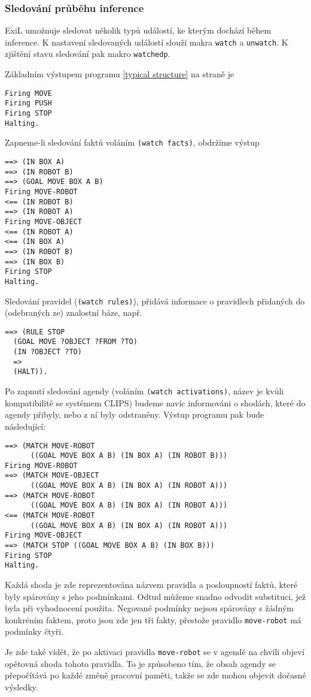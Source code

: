 \subsubsection{Sledování průběhu inference}
\label{inference tracing}
ExiL umožnuje sledovat několik typů událostí, ke kterým dochází během inference.
K nastavení sledovaných událostí slouží makra \verb|watch| a \verb|unwatch|. K
zjištění stavu sledování pak makro \verb|watchedp|.

Základním výstupem programu \ref{typical structure} na straně \pageref{typical
structure} je
\begin{verbatim}
Firing MOVE
Firing PUSH
Firing STOP
Halting.
\end{verbatim}
Zapneme-li sledování faktů voláním \verb|(watch facts)|, obdržíme výstup
\begin{verbatim}
==> (IN BOX A)
==> (IN ROBOT B)
==> (GOAL MOVE BOX A B)
Firing MOVE-ROBOT
<== (IN ROBOT B)
==> (IN ROBOT A)
Firing MOVE-OBJECT
<== (IN ROBOT A)
<== (IN BOX A)
==> (IN ROBOT B)
==> (IN BOX B)
Firing STOP
Halting.
\end{verbatim}

Sledování pravidel (\verb|(watch rules)|), přidává informace o pravidlech
přidaných do (odebraných ze) znalostní báze, např.
\begin{verbatim}
==> (RULE STOP
  (GOAL MOVE ?OBJECT ?FROM ?TO)
  (IN ?OBJECT ?TO)
  =>
  (HALT)).
\end{verbatim}

Po zapnutí sledování agendy (voláním \verb|(watch activations)|, název je kvůli
kompatibilitě se systémem CLIPS) budeme navíc informováni o shodách, které do
agendy přibyly, nebo z ní byly odstraněny. Výstup programu pak bude následující:
\begin{verbatim}
==> (MATCH MOVE-ROBOT
      ((GOAL MOVE BOX A B) (IN BOX A) (IN ROBOT B)))
Firing MOVE-ROBOT
==> (MATCH MOVE-OBJECT
      ((GOAL MOVE BOX A B) (IN BOX A) (IN ROBOT A)))
==> (MATCH MOVE-ROBOT
      ((GOAL MOVE BOX A B) (IN BOX A) (IN ROBOT A)))
<== (MATCH MOVE-ROBOT
      ((GOAL MOVE BOX A B) (IN BOX A) (IN ROBOT A)))
Firing MOVE-OBJECT
==> (MATCH STOP ((GOAL MOVE BOX A B) (IN BOX B)))
Firing STOP
Halting.
\end{verbatim}
Každá shoda je zde reprezentována názvem pravidla a posloupností faktů, které
byly spárovány s jeho podmínkami. Odtud můžeme snadno odvodit substituci, jež
byla při vyhodnocení použita. Negované podmínky nejsou spárovány s žádným
konkréním faktem, proto jsou zde jen tři fakty, přestože pravidlo
\verb|move-robot| má podmínky čtyři.

Je zde také vidět, že po aktivaci pravidla
\verb|move-robot| se v agendě na chvíli objeví opětovná shoda tohoto pravidla.
To je způsobeno tím, že obsah agendy se přepočítává po každé změně pracovní
paměti, takže se zde mohou objevit dočasné výsledky.
